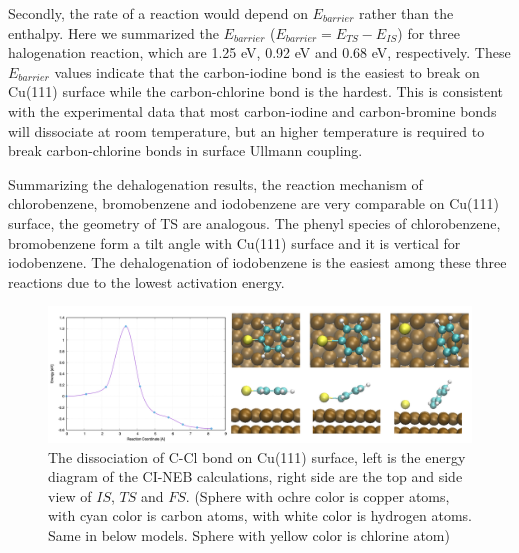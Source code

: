 \documentclass[%
 reprint,
 amsmath,amssymb,
 aps,
prb,
]{revtex4-2}
\begin{document}
Secondly, the rate of a reaction would depend on $E_{barrier}$ rather than the enthalpy. Here we summarized the $E_{barrier}$ ($E_{barrier} = E_{TS} - E_{IS}$) for three halogenation reaction, which are 1.25 eV, 0.92 eV and 0.68 eV, respectively. These $E_{barrier}$ values indicate that the carbon-iodine bond is the easiest to break on Cu(111) surface while the carbon-chlorine bond is the hardest. This is consistent with the experimental data that most carbon-iodine and carbon-bromine bonds will dissociate at room temperature, but an higher temperature is required to break carbon-chlorine bonds in surface Ullmann coupling.


Summarizing the dehalogenation results, the reaction mechanism of chlorobenzene, bromobenzene and iodobenzene are very comparable on Cu(111) surface, the geometry of TS are analogous. The phenyl species of chlorobenzene, bromobenzene form a tilt angle with Cu(111) surface and it is vertical for iodobenzene. The dehalogenation of iodobenzene is the easiest among these three reactions due to the lowest activation energy.

\begin{figure}[hbt]
\centering
\includegraphics[width=1.0\textwidth]{Fig/dissociation_Cl.png}
\caption{The dissociation of C-Cl bond on Cu(111) surface, left is the energy diagram of the CI-NEB calculations, right side are the top and side view of $IS$, $TS$ and $FS$. (Sphere with ochre color is copper atoms, with cyan color is carbon atoms, with white color is hydrogen atoms. Same in below models. Sphere with yellow color is chlorine atom)}
\label{fig:dissociation_Cl}
\end{figure}
\end{document}
